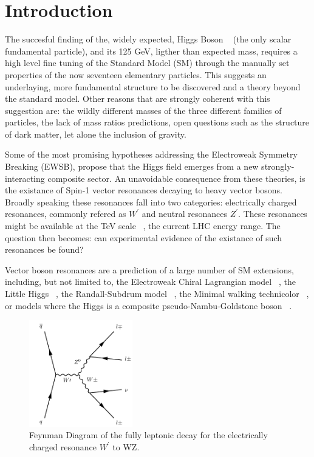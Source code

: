 \section{Introduction}

The succesful finding of the, widely expected, Higgs Boson ~\cite{higgsPaperCMS,higgsPaperATLAS}
(the only scalar fundamental particle), and its 125 GeV, ligther than expected mass,
requires a high level fine tuning of the Standard Model (SM) through the
manually set properties of the now seventeen elementary particles.
This suggests an underlaying, more fundamental structure to be discovered and
a theory beyond the standard model. Other
reasons that are strongly coherent with this suggestion are: the wildly
different masses of the three different families of particles, the lack of
mass ratios predictions, open questions such as the structure of dark matter,
let alone the inclusion of gravity.

Some of the most promising hypotheses addressing the Electroweak Symmetry
Breaking (EWSB), propose that the Higgs field
emerges from a new strongly-interacting composite sector. An unavoidable
consequence from these theories, is the existance of Spin-1 vector resonances
decaying to heavy vector bosons.  Broadly speaking these resonances
fall into  two categories: electrically
charged resonances, commonly refered as $W^{\prime}$ and
neutral resonances $Z^{\prime}$. These resonances might be available at the TeV
scale ~\cite{tevscale2014}, the current LHC energy range. The question then becomes:
can experimental evidence of the existance of such resonances be found?

Vector boson resonances are a prediction of a large number
of SM extensions, including, but not limited to, the Electroweak Chiral
Lagrangian model ~\cite{echl2017}, the Little Higgs
~\cite{littlehiggs2007}, the Randall-Subdrum  model ~\cite{randall1999}, the
Minimal walking technicolor ~\cite{technicolor2007}, or models where the Higgs
is a composite pseudo-Nambu-Goldstone boson ~\cite{composite2016}.

\begin{figure}[tph]
  \centering
  \includegraphics[width=0.4\textwidth]{fig/WprimeFeynmanDiagram.pdf}
  \caption{ Feynman Diagram of the fully leptonic decay for the
    electrically charged resonance $W^{\prime}$ to WZ.}
  \label{fig:Wprime_FeynmanDiagram}
\end{figure}

